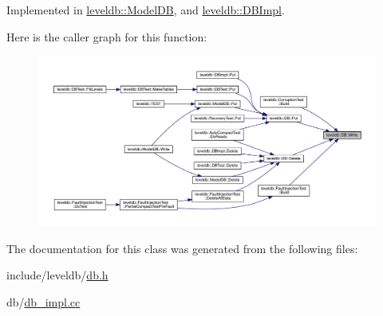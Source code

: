 Implemented in \mbox{\hyperlink{classleveldb_1_1_model_d_b_ae3a20d2fc971376349b142b9c2d159be}{leveldb\+::\+Model\+DB}}, and \mbox{\hyperlink{classleveldb_1_1_d_b_impl_ac0d0b472717099d6a02ad9dace4e8ef4}{leveldb\+::\+D\+B\+Impl}}.

Here is the caller graph for this function\+:
\nopagebreak
\begin{figure}[H]
\begin{center}
\leavevmode
\includegraphics[width=350pt]{classleveldb_1_1_d_b_ae0b6ded8c8e0b88ff70190bf7a0c086c_icgraph}
\end{center}
\end{figure}


The documentation for this class was generated from the following files\+:\begin{DoxyCompactItemize}
\item 
include/leveldb/\mbox{\hyperlink{db_8h}{db.\+h}}\item 
db/\mbox{\hyperlink{db__impl_8cc}{db\+\_\+impl.\+cc}}\end{DoxyCompactItemize}
